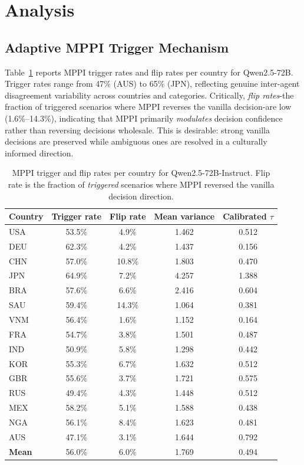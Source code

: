 \documentclass{article}
\begin{document}
\section{Analysis}
\label{sec:analysis}

\subsection{Adaptive MPPI Trigger Mechanism}
\label{sec:analysis:trigger}

Table~\ref{tab:trigger} reports MPPI trigger rates and flip rates per country for
Qwen2.5-72B. Trigger rates range from 47\% (AUS) to 65\% (JPN), reflecting genuine
inter-agent disagreement variability across countries and categories. Critically,
\emph{flip rates}-the fraction of triggered scenarios where MPPI reverses the
vanilla decision-are low (1.6\%--14.3\%), indicating that MPPI primarily
\emph{modulates} decision confidence rather than reversing decisions wholesale.
This is desirable: strong vanilla decisions are preserved while ambiguous ones are
resolved in a culturally informed direction.

\begin{table}[t]
\caption{MPPI trigger and flip rates per country for Qwen2.5-72B-Instruct.
    Flip rate is the fraction of \emph{triggered} scenarios where MPPI reversed
    the vanilla decision direction.}
\label{tab:trigger}
\centering
\setlength{\tabcolsep}{5pt}
\footnotesize
\begin{tabular}{lcccc}
\toprule
Country & Trigger rate & Flip rate & Mean variance & Calibrated $\tau$ \\
\midrule
USA & 53.5\% & 4.9\% & 1.462 & 0.512 \\
DEU & 62.3\% & 4.2\% & 1.437 & 0.156 \\
CHN & 57.0\% & 10.8\% & 1.803 & 0.470 \\
JPN & 64.9\% & 7.2\% & 4.257 & 1.388 \\
BRA & 57.6\% & 6.6\% & 2.416 & 0.604 \\
SAU & 59.4\% & 14.3\% & 1.064 & 0.381 \\
VNM & 56.4\% & 1.6\% & 1.152 & 0.164 \\
FRA & 54.7\% & 3.8\% & 1.501 & 0.487 \\
IND & 50.9\% & 5.8\% & 1.298 & 0.442 \\
KOR & 55.3\% & 6.7\% & 1.632 & 0.512 \\
GBR & 55.6\% & 3.7\% & 1.721 & 0.575 \\
RUS & 49.4\% & 4.3\% & 1.448 & 0.512 \\
MEX & 58.2\% & 5.1\% & 1.588 & 0.438 \\
NGA & 56.1\% & 8.4\% & 1.623 & 0.481 \\
AUS & 47.1\% & 3.1\% & 1.644 & 0.792 \\
\midrule
\textbf{Mean} & 56.0\% & 6.0\% & 1.769 & 0.494 \\
\bottomrule
\end{tabular}
\end{table}
\end{document}
